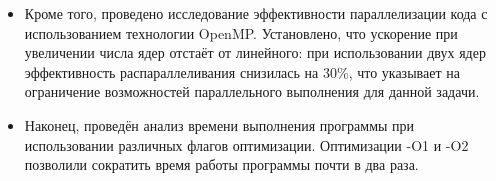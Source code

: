 \begin{itemize}
    \item Кроме того, проведено исследование эффективности параллелизации кода с использованием технологии OpenMP. Установлено, что ускорение при увеличении числа ядер отстаёт от линейного: при использовании двух ядер эффективность распараллеливания снизилась на 30\%, что указывает на ограничение возможностей параллельного выполнения для данной задачи.
    
    \item Наконец, проведён анализ времени выполнения программы при использовании различных флагов оптимизации. Оптимизации -O1 и -O2 позволили сократить время работы программы почти в два раза.
\end{itemize}